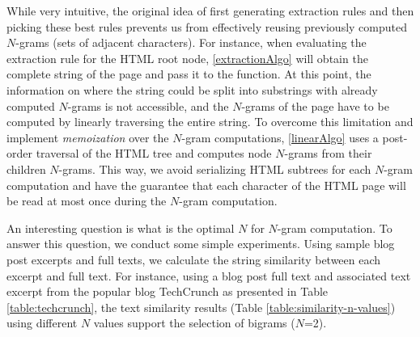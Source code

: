 \linearAlgo

While very intuitive, the original idea of first generating extraction 
rules and then picking these best rules prevents us from effectively 
reusing previously computed $N$-grams (sets of adjacent characters). 
For instance, when evaluating the extraction rule for the HTML root node, 
\autoref{extractionAlgo} will obtain the complete string of the page 
and pass it to the  function. At this point, 
the information on where the string could be split into substrings with 
already computed $N$-grams is not accessible, and the $N$-grams of 
the page have to be computed by linearly traversing the entire string. 
To overcome this limitation and implement \emph{memoization} over the 
$N$-gram computations, \autoref{linearAlgo} uses a post-order traversal 
of the HTML tree and computes node $N$-grams from their children 
$N$-grams. This way, we avoid serializing HTML subtrees for each 
$N$-gram computation and have the guarantee that each character of the 
HTML page will be read at most once during the $N$-gram computation.

An interesting question is what is the optimal $N$ for $N$-gram 
computation. To answer this question, we conduct some simple experiments. 
Using sample blog post excerpts and full texts, we calculate the string 
similarity between each excerpt and full text. For instance, using a blog 
post full text and associated text excerpt from the popular blog TechCrunch
as presented in Table \ref{table:techcrunch}, the text similarity results
(Table \ref{table:similarity-n-values}) using different $N$ values support
the selection of bigrams ($N$=2).

